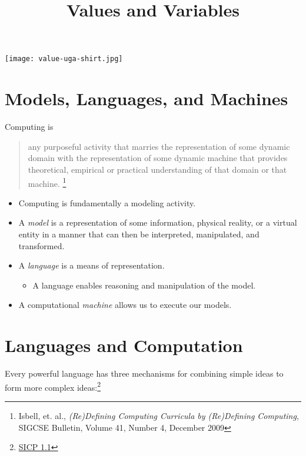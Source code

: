 \documentclass{article}
\title{Values and Variables}
\date{}
\begin{document}
\maketitle

\begin{center}
\texttt{[image: value-uga-shirt.jpg]}
\end{center}


\section{Models, Languages, and Machines}

Computing is

\begin{quote}
any purposeful activity that marries the representation of some dynamic domain with the representation of some dynamic machine that provides theoretical, empirical or practical understanding of that domain or that machine.
\footnote{Isbell, et. al., {\it (Re)Defining Computing Curricula by (Re)Defining Computing}, SIGCSE Bulletin, Volume 41, Number 4, December 2009}
\end{quote}

\begin{itemize}
\item Computing is fundamentally a modeling activity.
\item A {\it model} is a representation of some information, physical reality, or a virtual entity in a manner that can then be interpreted, manipulated, and transformed.
\item A {\it language} is a means of representation.
\begin{itemize}
  \item A language enables reasoning and manipulation of the model.
\end{itemize}
\item A computational {\it machine} allows us to execute our models.
\end{itemize}




\section{Languages and Computation}

Every powerful language has three mechanisms for  combining simple ideas to form more complex ideas:\footnote{\href{http://mitpress.mit.edu/sicp/full-text/book/book-Z-H-10.html}{SICP 1.1}}
\end{document}
